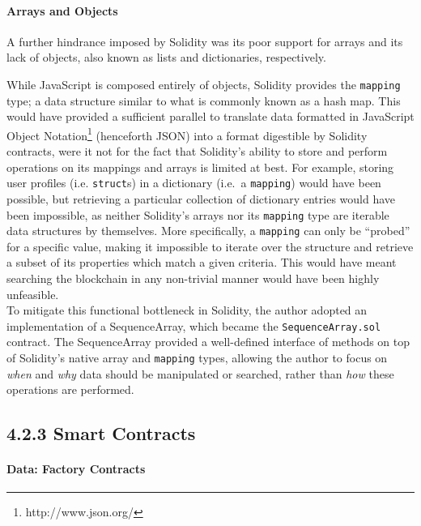 \paragraph{Arrays and Objects}\label{arrays-and-objects}

A further hindrance imposed by Solidity was its poor support for arrays
and its lack of objects, also known as lists and dictionaries,
respectively.

While JavaScript is composed entirely of objects, Solidity provides the
\texttt{mapping} type; a data structure similar to what is commonly
known as a hash map. This would have provided a sufficient
parallel to translate data formatted in JavaScript Object
Notation\footnote{http://www.json.org/} (henceforth JSON) into a
format digestible by Solidity contracts, were it not for the fact that
Solidity's ability to store and perform operations on its mappings and
arrays is limited at best. For example, storing user profiles (i.e.
\texttt{struct}s) in a dictionary (i.e.~a \texttt{mapping}) would have
been possible, but retrieving a particular collection of dictionary
entries would have been impossible, as neither Solidity's arrays nor its
\texttt{mapping} type are iterable data structures by themselves. More
specifically, a \texttt{mapping} can only be ``probed'' for a specific
value, making it impossible to iterate over the structure and retrieve a
subset of its properties which match a given criteria. This would have
meant searching the blockchain in any non-trivial manner would have been
highly unfeasible.\\
To mitigate this functional bottleneck in Solidity, the author adopted
an implementation of a SequenceArray\cite{Shaffer2013}, which became the
\texttt{SequenceArray.sol} contract. The SequenceArray provided a
well-defined interface of methods on top of Solidity's native array and
\texttt{mapping} types, allowing the author to focus on \emph{when} and
\emph{why} data should be manipulated or searched, rather than
\emph{how} these operations are performed.

\subsection{4.2.3 Smart Contracts}\label{smart-contracts}

\paragraph{Data: Factory Contracts}\label{data-factory-contracts}

